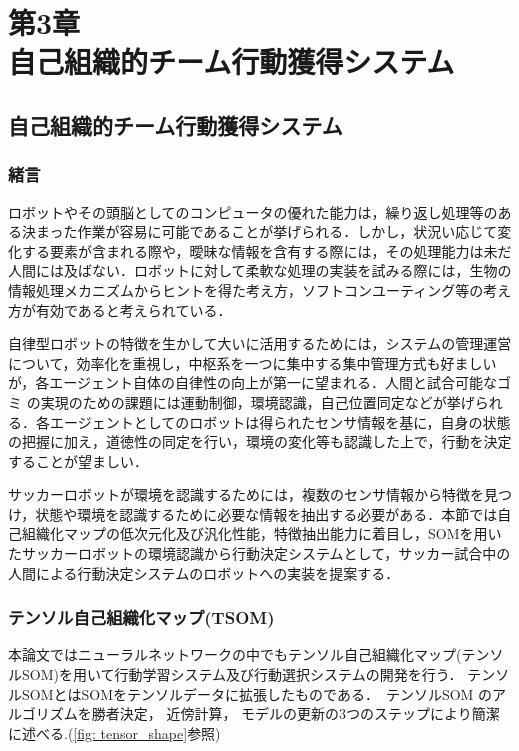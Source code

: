 \part*{第3章\\自己組織的チーム行動獲得システム}
\chapter{自己組織的チーム行動獲得システム}
\section{緒言}
ロボットやその頭脳としてのコンピュータの優れた能力は，繰り返し処理等のある決まった作業が容易に可能であることが挙げられる．しかし，状況い応じて変化する要素が含まれる際や，曖昧な情報を含有する際には，その処理能力は未だ人間には及ばない．ロボットに対して柔軟な処理の実装を試みる際には，生物の情報処理メカニズムからヒントを得た考え方，ソフトコンユーティング等の考え方が有効であると考えられている．\par
自律型ロボットの特徴を生かして大いに活用するためには，システムの管理運営について，効率化を重視し，中枢系を一つに集中する集中管理方式も好ましいが，各エージェント自体の自律性の向上が第一に望まれる．人間と試合可能なゴミ の実現のための課題には運動制御，環境認識，自己位置同定などが挙げられる．各エージェントとしてのロボットは得られたセンサ情報を基に，自身の状態の把握に加え，道徳性の同定を行い，環境の変化等も認識した上で，行動を決定することが望ましい．\par
サッカーロボットが環境を認識するためには，複数のセンサ情報から特徴を見つけ，状態や環境を認識するために必要な情報を抽出する必要がある．本節では自己組織化マップの低次元化及び汎化性能，特徴抽出能力に着目し，SOMを用いたサッカーロボットの環境認識から行動決定システムとして，サッカー試合中の人間による行動決定システムのロボットへの実装を提案する．


%
\clearpage
\section{テンソル自己組織化マップ(TSOM)}
本論文ではニューラルネットワークの中でもテンソル自己組織化マップ(テンソルSOM)を用いて行動学習システム及び行動選択システムの開発を行う． テンソルSOMとはSOMをテンソルデータに拡張したものである．　テンソルSOM のアルゴリズムを勝者決定， 近傍計算， モデルの更新の3つのステップにより簡潔に述べる.\cite{TSOM}(\ref{fig: tensor_shape}参照)

